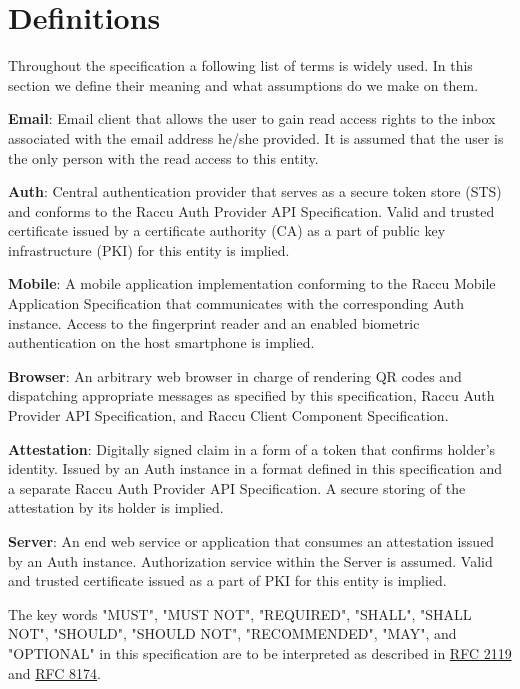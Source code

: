 \section{Definitions}
Throughout the specification a following list of terms is widely used. In this section we define their meaning 
and what assumptions do we make on them.

\medskip
\textbf{Email}: Email client that allows the user to gain read access rights to the inbox associated
with the email address he/she provided. It is assumed that the user is the only person with the read access 
to this entity.

\medskip
\textbf{Auth}: Central authentication provider that serves as a secure token store (STS) and conforms to 
the Raccu Auth Provider API Specification. Valid and trusted certificate issued by a certificate authority
(CA) as a part of public key infrastructure (PKI) for this entity is implied.

\medskip
\textbf{Mobile}: A mobile application implementation conforming to the Raccu Mobile Application Specification 
that communicates with the corresponding Auth instance. Access to the fingerprint reader and an enabled biometric 
authentication on the host smartphone is implied.

\medskip
\textbf{Browser}: An arbitrary web browser in charge of rendering QR codes and dispatching appropriate messages  
as specified by this specification, Raccu Auth Provider API Specification, and Raccu Client Component Specification.

\medskip
\textbf{Attestation}: Digitally signed claim in a form of a token that confirms holder's identity. Issued by 
an Auth instance in a format defined in this specification and a separate Raccu Auth Provider API Specification. 
A secure storing of the attestation by its holder is implied.

\medskip
\textbf{Server}: An end web service or application that consumes an attestation issued by an Auth instance. 
Authorization service within the Server is assumed. Valid and trusted certificate issued as a part of PKI 
for this entity is implied.

\medskip
The key words "MUST", "MUST NOT", "REQUIRED", "SHALL", "SHALL NOT", "SHOULD", "SHOULD NOT", "RECOMMENDED", 
"MAY", and "OPTIONAL" in this specification are to be interpreted as described in 
\href{https://tools.ietf.org/html/rfc2119}{RFC 2119} and \href{https://tools.ietf.org/html/rfc8174}{RFC 8174}.